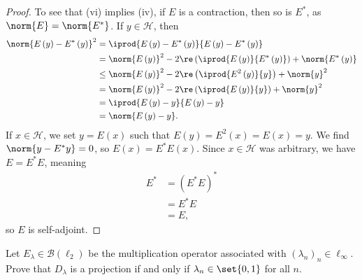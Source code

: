 \documentclass[10pt]{mypackage}
\begin{document}
\begin{proof}
  To see that (vi) implies (iv), if $E$ is a contraction, then so is $E^{\ast}$, as $\norm{E} = \norm{E^{\ast}}$. If $y\in \mathcal{H}$, then
  \begin{align*}
    \norm{E\left(y\right) - E^{\ast}\left(y\right)}^2 &= \iprod{E\left(y\right) - E^{\ast}\left(y\right)}{E\left(y\right)-E^{\ast}\left(y\right)}\\
                                                      &= \norm{E\left(y\right)}^2 - 2\re\left( \iprod{E\left(y\right)}{E^{\ast}\left(y\right)}\right) + \norm{E^{\ast}\left(y\right)}\\
                                                      &\leq \norm{E\left(y\right)}^2 - 2\re\left( \iprod{E^2\left(y\right)}{y}\right) + \norm{y}^2\\
                                                      &= \norm{E\left(y\right)}^2 - 2\re\left( \iprod{E\left(y\right)}{y}\right)+ \norm{y}^2\\
                                                      &= \iprod{E\left(y\right) - y}{E\left(y\right)-y}\\
                                                      &= \norm{E\left(y\right) - y}.
  \end{align*}
  If $x\in \mathcal{H}$, we set $y = E\left(x\right)$ such that $E\left(y\right) = E^2\left(x\right) = E\left(x\right) = y$. We find $\norm{y - E^{\ast}y} = 0$, so $E\left(x\right) = E^{\ast}E\left(x\right)$. Since $x\in \mathcal{H}$ was arbitrary, we have $E = E^{\ast}E$, meaning
  \begin{align*}
    E^{\ast} &= \left(E^{\ast}E\right)^{\ast}\\
             &= E^{\ast}E\\
             &= E,
  \end{align*}
  so $E$ is self-adjoint.
\end{proof}
\begin{exercise}
  Let $E_{\lambda}\in \mathcal{B}\left(\ell_2\right)$ be the multiplication operator associated with $\left(\lambda_n\right)_n\in \ell_{\infty}$. Prove that $D_{\lambda}$ is a projection if and only if $\lambda_n\in \set{0,1}$ for all $n$.
\end{exercise}
\end{document}
